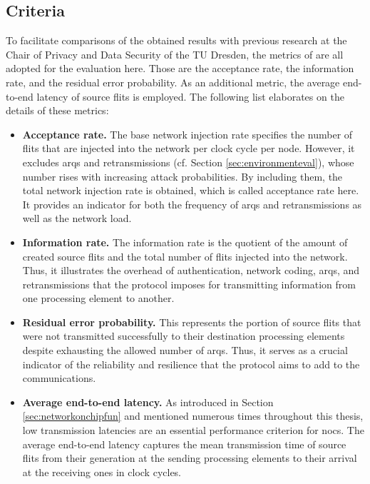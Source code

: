 \subsection{Criteria}\label{subsec:criteria}
To facilitate comparisons of the obtained results with previous research at the Chair of Privacy and Data Security of the TU Dresden, the metrics of
\citeauthor{moriam18activeattackers} \cite{moriam18activeattackers} are all adopted for the evaluation here. Those are the acceptance rate, the
information rate, and the residual error probability. As an additional metric, the average end-to-end latency of source flits is employed. The following list elaborates on the
details of these metrics:
\begin{itemize}
    \item \textbf{Acceptance rate.} The base network injection rate specifies the number of flits that are injected into the network per clock cycle
        per node. However, it excludes \glspl{arq} and retransmissions (cf. Section \ref{sec:environmenteval}), whose number rises with increasing
        attack probabilities. By including them, the total network injection rate is obtained, which is called acceptance rate here. It provides an
        indicator for both the frequency of \glspl{arq} and retransmissions as well as the network load.
    \item \textbf{Information rate.} The information rate is the quotient of the amount of created source flits and the total number of flits injected
        into the network. Thus, it illustrates the overhead of authentication, network coding, \glspl{arq}, and retransmissions that the protocol
        imposes for transmitting information from one processing element to another.
    \item \textbf{Residual error probability.} This represents the portion of source flits that were not transmitted successfully to their destination
        processing elements despite exhausting the allowed number of \glspl{arq}. Thus, it serves as a crucial indicator of the reliability and
        resilience that the protocol aims to add to the communications.
    \item \textbf{Average end-to-end latency.} As introduced in Section \ref{sec:networkonchipfun} and mentioned numerous times throughout this
        thesis, low transmission latencies are an essential performance criterion for \glspl{noc}. The average end-to-end latency captures the mean
        transmission time of source flits from their generation at the sending processing elements to their arrival at the receiving ones in clock
        cycles.
\end{itemize}

